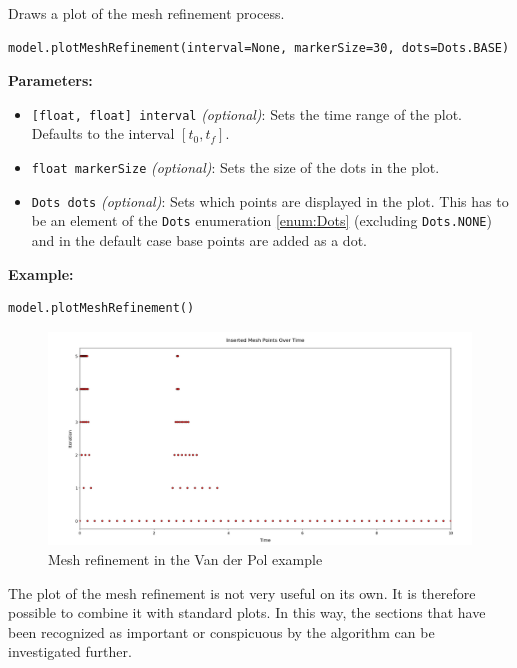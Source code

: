 \documentclass[12pt]{article}
\begin{document}
\begin{mdframed}[backgroundcolor=gray!10, roundcorner=10pt,
		linewidth=1pt]
	
	Draws a plot of the mesh refinement process.
 
	\begin{lstlisting}
model.plotMeshRefinement(interval=None, markerSize=30, dots=Dots.BASE)
		\end{lstlisting}
	\label{plotMeshRefinement}
	\textbf{Parameters:}
	\begin{itemize}
		\item \texttt{[float, float] interval} \emph{(optional)}: Sets the time range of the plot. Defaults to the interval $[t_0, t_f]$.
		
		\item \texttt{float markerSize} \emph{(optional)}: Sets the size of the dots in the plot.
		
		\item \texttt{Dots dots} \emph{(optional)}: Sets which points are displayed in the plot. This has to be an element of the \texttt{Dots} enumeration \eqref{enum:Dots} (excluding \texttt{Dots.NONE}) and in the default case base points are added as a dot.
	\end{itemize}
	
	\textbf{Example:}
\begin{lstlisting}
model.plotMeshRefinement()
\end{lstlisting}
\begin{figure}[H]
	\centering
	\includegraphics[width=1\textwidth]{images/refinementVDP.png}
	\caption{Mesh refinement in the Van der Pol example}
	\label{fig:vdp}
\end{figure}
\end{mdframed}

The plot of the mesh refinement is not very useful on its own. It is therefore possible to combine it with standard plots. In this way, the sections that have been recognized as important or conspicuous by the  algorithm can be investigated further.
\end{document}

